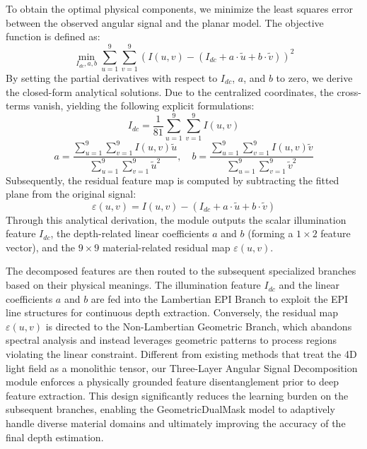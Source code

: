 To obtain the optimal physical components, we minimize the least squares error between the observed angular signal and the planar model. The objective function is defined as:
\begin{equation}
\label{eq:eq4}
\min_{I_{dc}, a, b} \sum_{u=1}^{9} \sum_{v=1}^{9} \left( I(u,v) - (I_{dc} + a \cdot \tilde{u} + b \cdot \tilde{v}) \right)^2
\end{equation}
By setting the partial derivatives with respect to $I_{dc}$, $a$, and $b$ to zero, we derive the closed-form analytical solutions. Due to the centralized coordinates, the cross-terms vanish, yielding the following explicit formulations:
\begin{equation}
\label{eq:eq5}
I_{dc} = \frac{1}{81} \sum_{u=1}^{9} \sum_{v=1}^{9} I(u,v)
\end{equation}
\begin{equation}
\label{eq:eq6}
a = \frac{\sum_{u=1}^{9} \sum_{v=1}^{9} I(u,v) \tilde{u}}{\sum_{u=1}^{9} \sum_{v=1}^{9} \tilde{u}^2}, \quad b = \frac{\sum_{u=1}^{9} \sum_{v=1}^{9} I(u,v) \tilde{v}}{\sum_{u=1}^{9} \sum_{v=1}^{9} \tilde{v}^2}
\end{equation}
Subsequently, the residual feature map is computed by subtracting the fitted plane from the original signal:
\begin{equation}
\label{eq:eq7}
\varepsilon(u,v) = I(u,v) - (I_{dc} + a \cdot \tilde{u} + b \cdot \tilde{v})
\end{equation}
Through this analytical derivation, the module outputs the scalar illumination feature $I_{dc}$, the depth-related linear coefficients $a$ and $b$ (forming a $1 \times 2$ feature vector), and the $9 \times 9$ material-related residual map $\varepsilon(u,v)$.

The decomposed features are then routed to the subsequent specialized branches based on their physical meanings. The illumination feature $I_{dc}$ and the linear coefficients $a$ and $b$ are fed into the Lambertian EPI Branch to exploit the EPI line structures for continuous depth extraction. Conversely, the residual map $\varepsilon(u,v)$ is directed to the Non-Lambertian Geometric Branch, which abandons spectral analysis and instead leverages geometric patterns to process regions violating the linear constraint. Different from existing methods that treat the 4D light field as a monolithic tensor, our Three-Layer Angular Signal Decomposition module enforces a physically grounded feature disentanglement prior to deep feature extraction. This design significantly reduces the learning burden on the subsequent branches, enabling the GeometricDualMask model to adaptively handle diverse material domains and ultimately improving the accuracy of the final depth estimation.

